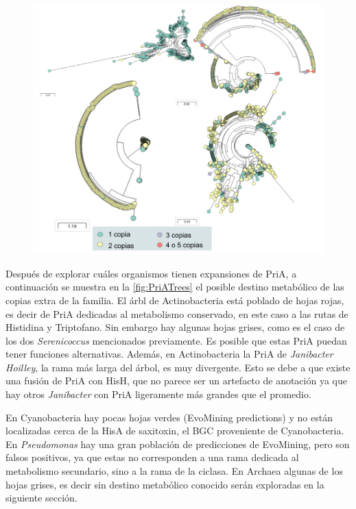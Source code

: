 \documentclass[12pt,twoside]{reedthesis}
\begin{document}
  \begin{figure}[h!tbp]
  \centering
  \includegraphics[angle = 0,scale = 0.8]{chapter4/PriAEvoMiningCopies.pdf}
  \caption[Copias extras de PriA en Actinobacteria, Cyanobacteria, Pseudomonas y Archaea]{\footnotesize{}}
  \label{fig:PriAEvoMiningCopies}
  \end{figure}
  
  Después de explorar cuáles organismos tienen expansiones de PriA, a
  continuación se muestra en la \autoref{fig:PriATrees} el posible destino
  metabólico de las copias extra de la familia. El árbl de Actinobacteria
  está poblado de hojas rojas, es decir de PriA dedicadas al metabolismo
  conservado, en este caso a las rutas de Histidina y Triptofano. Sin
  embargo hay algunas hojas grises, como es el caso de los dos
  \emph{Serenicoccus} mencionados previamente. Es posible que estas PriA
  puedan tener funciones alternativas. Además, en Actinobacteria la PriA
  de \emph{Janibacter Hoilley}, la rama más larga del árbol, es muy
  divergente. Esto se debe a que existe una fusión de PriA con HisH, que
  no parece ser un artefacto de anotación ya que hay otros
  \emph{Janibacter} con PriA ligeramente más grandes que el promedio.
  
  En Cyanobacteria hay pocas hojas verdes (EvoMining predictions) y no
  están localizadas cerca de la HisA de saxitoxin, el BGC proveniente de
  Cyanobacteria. En \emph{Pseudomonas} hay una gran población de
  predicciones de EvoMining, pero son falsos positivos, ya que estas no
  corresponden a una rama dedicada al metabolismo secundario, sino a la
  rama de la ciclasa. En Archaea algunas de los hojas grises, es decir sin
  destino metabólico conocido serán exploradas en la siguiente sección.
  
\end{document}

